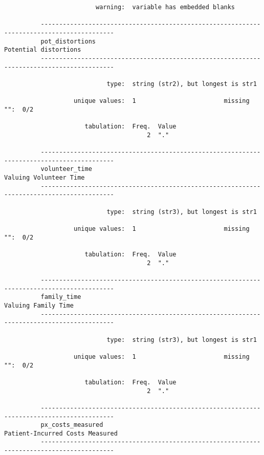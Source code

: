\documentclass{article}
\begin{document}
\begin{verbatim}
                         warning:  variable has embedded blanks
          
          ------------------------------------------------------------------------------------------
          pot_distortions                                                      Potential distortions
          ------------------------------------------------------------------------------------------
          
                            type:  string (str2), but longest is str1
          
                   unique values:  1                        missing "":  0/2
          
                      tabulation:  Freq.  Value
                                       2  "."
          
          ------------------------------------------------------------------------------------------
          volunteer_time                                                      Valuing Volunteer Time
          ------------------------------------------------------------------------------------------
          
                            type:  string (str3), but longest is str1
          
                   unique values:  1                        missing "":  0/2
          
                      tabulation:  Freq.  Value
                                       2  "."
          
          ------------------------------------------------------------------------------------------
          family_time                                                            Valuing Family Time
          ------------------------------------------------------------------------------------------
          
                            type:  string (str3), but longest is str1
          
                   unique values:  1                        missing "":  0/2
          
                      tabulation:  Freq.  Value
                                       2  "."
          
          ------------------------------------------------------------------------------------------
          px_costs_measured                                          Patient-Incurred Costs Measured
          ------------------------------------------------------------------------------------------
          

\end{verbatim}
\end{document}
